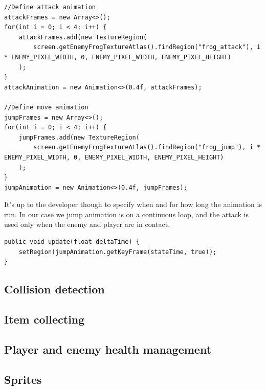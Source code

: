 \documentclass[12p]{article}
\begin{document}
\begin{verbatim}
//Define attack animation
attackFrames = new Array<>();
for(int i = 0; i < 4; i++) {
    attackFrames.add(new TextureRegion(
        screen.getEnemyFrogTextureAtlas().findRegion("frog_attack"), i * ENEMY_PIXEL_WIDTH, 0, ENEMY_PIXEL_WIDTH, ENEMY_PIXEL_HEIGHT)
    );
}
attackAnimation = new Animation<>(0.4f, attackFrames);

//Define move animation
jumpFrames = new Array<>();
for(int i = 0; i < 4; i++) {
    jumpFrames.add(new TextureRegion(
        screen.getEnemyFrogTextureAtlas().findRegion("frog_jump"), i * ENEMY_PIXEL_WIDTH, 0, ENEMY_PIXEL_WIDTH, ENEMY_PIXEL_HEIGHT)
    );
}
jumpAnimation = new Animation<>(0.4f, jumpFrames);
\end{verbatim}

It's up to the developer though to specify when and for how long the animation is run. In our case we jump animation is on a continuous loop, and the attack is used only when the enemy and player are in contact.

\begin{verbatim}
public void update(float deltaTime) {
    setRegion(jumpAnimation.getKeyFrame(stateTime, true));
}
\end{verbatim}



\subsection{Collision detection}


\subsection{Item collecting}


\subsection{Player and enemy health management}


\subsection{Sprites}
\end{document}
